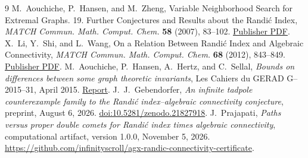 \documentclass[11pt]{article}
\begin{document}
\begin{thebibliography}{9}
M.~Aouchiche, P.~Hansen, and M.~Zheng,
Variable Neighborhood Search for Extremal Graphs. 19. Further Conjectures
and Results about the Randi\'c Index,
\emph{MATCH Commun. Math. Comput. Chem.} \textbf{58} (2007), 83--102.
\href{https://match.pmf.kg.ac.rs/electronic_versions/Match58/n1/match58n1_83-102.pdf}{Publisher PDF}.
X.~Li, Y.~Shi, and L.~Wang,
On a Relation Between Randi\'c Index and Algebraic Connectivity,
\emph{MATCH Commun. Math. Comput. Chem.} \textbf{68} (2012), 843--849.
\href{https://match.pmf.kg.ac.rs/electronic_versions/Match68/n3/match68n3_843-849.pdf}{Publisher PDF}.
M.~Aouchiche, P.~Hansen, A.~Hertz, and C.~Sellal,
\emph{Bounds on differences between some graph theoretic invariants},
Les Cahiers du GERAD G--2015--31, April 2015.
\href{https://www.gerad.ca/fr/papers/G-2015-31.pdf}{Report}.
J.~J.~Gebendorfer,
\emph{An infinite tadpole counterexample family to the Randi\'c
index--algebraic connectivity conjecture}, preprint, August 6, 2026.
\href{https://doi.org/10.5281/zenodo.21827918}{doi:10.5281/zenodo.21827918}.
J.~Prajapati, \emph{Paths versus proper double comets for Randi\'c index
times algebraic connectivity}, computational artifact, version 1.0.0,
November 5, 2026.
\url{https://github.com/infinityscroll/agx-randic-connectivity-certificate}.
\end{thebibliography}
\end{document}
